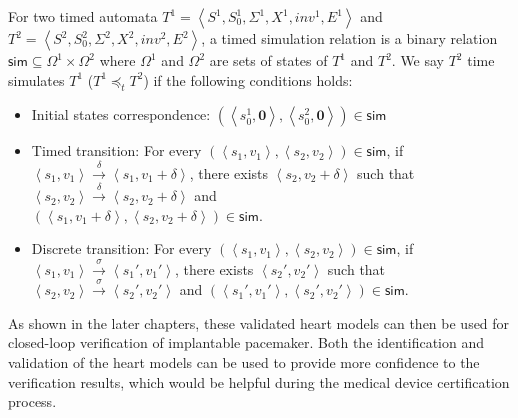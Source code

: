 For two timed automata $T^1=\left\langle S^1,S_0^1,\Sigma^1,X^1,inv^1,E^1\right\rangle$ and $T^2=\left\langle S^2,S_0^2,\Sigma^2,X^2,inv^2,E^2\right\rangle$, a timed simulation relation is a binary relation $\textsf{sim}\subseteq \Omega^1\times \Omega^2$ where $\Omega^1$ and $\Omega^2$ are sets of states of $T^1$ and $T^2$. We say $T^2$ \textsf{time simulates} $T^1$ ($T^1 \preceq_t T^2$) if the following conditions holds:
\begin{itemize}
	\item Initial states correspondence: $(\left\langle s_0^1,\textbf{0}\right\rangle,\left\langle s_0^2,\textbf{0}\right\rangle)\in \textsf{sim}$
	\item Timed transition: For every $(\left\langle s_1,v_1\right\rangle,\left\langle s_2,v_2\right\rangle)\in\textsf{sim}$, if $\left\langle s_1,v_1\right\rangle\xrightarrow{\delta}\left\langle s_1,v_1+\delta\right\rangle$, there exists $\left\langle s_2,v_2+\delta\right\rangle$ such that $\left\langle s_2,v_2\right\rangle\xrightarrow{\delta}\left\langle s_2,v_2+\delta\right\rangle$ and \\$(\left\langle s_1,v_1+\delta\right\rangle,\left\langle s_2,v_2+\delta\right\rangle)\in\textsf{sim}$.
	\item Discrete transition: For every $(\left\langle s_1,v_1\right\rangle,\left\langle s_2,v_2\right\rangle)\in\textsf{sim}$, if $\left\langle s_1,v_1\right\rangle\xrightarrow{\sigma}\left\langle s_1',v_1'\right\rangle$, there exists $\left\langle s_2',v_2'\right\rangle$ such that $\left\langle s_2,v_2\right\rangle\xrightarrow{\sigma}\left\langle s_2',v_2'\right\rangle$ and $(\left\langle s_1',v_1'\right\rangle,\left\langle s_2',v_2'\right\rangle)\in\textsf{sim}$.
\end{itemize}

As shown in the later chapters, these validated heart models can then be used for closed-loop verification of implantable pacemaker. Both the identification and validation of the heart models can be used to provide more confidence to the verification results, which would be helpful during the medical device certification process.
 